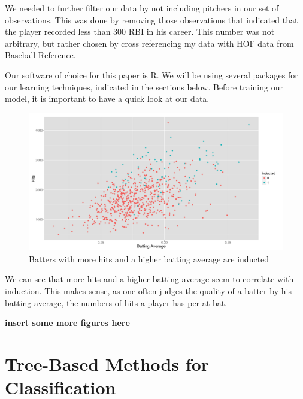 \documentclass[preprint,12pt]{elsarticle}
\begin{document}
We needed to further filter our data by not including pitchers in our set of observations. This was done by removing those observations that indicated that the player recorded less than 300 RBI in his career. This number was not arbitrary, but rather chosen by cross referencing my data with HOF data from Baseball-Reference.

Our software of choice for this paper is R. We will be using several packages for our learning techniques, indicated in the sections below. Before training our model, it is important to have a quick look at our data.

\begin{figure}[h]
	\centering
	\includegraphics[width=1\textwidth]{BAandHits}
	\caption{Batters with more hits and a higher batting average are inducted}
\end{figure}

We can see that more hits and a higher batting average seem to correlate with induction. This makes sense, as one often judges the quality of a batter by his batting average, the numbers of hits a player has per at-bat.

\bigskip
\textbf{insert some more figures here}






\section{Tree-Based Methods for Classification}
\end{document}
